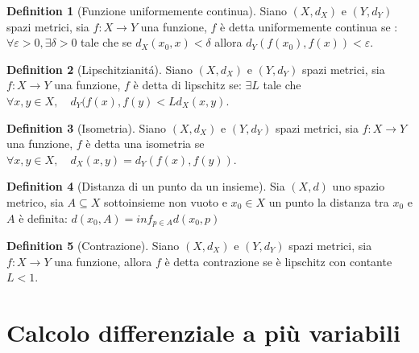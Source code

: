 \documentclass[leqno]{article}
\theoremstyle{definition}
\newtheorem{definition}{Definition}[section]
\numberwithin{equation}{section}
\theoremstyle{remark}
\begin{document}
	\begin{definition}[Funzione uniformemente continua]
		Siano $(X,d_X)$ e $(Y,d_Y)$ spazi metrici, sia $f:X\rightarrow Y$ una funzione, $f$ è detta uniformemente continua se : $\forall \varepsilon > 0, \exists \delta > 0 $ tale che se $d_X(x_0,x) < \delta$ allora $d_Y(f(x_0),f(x)) < \varepsilon$.
	\end{definition}
	\begin{definition}[Lipschitzianitá]
		Siano $(X,d_X)$ e $(Y,d_Y)$ spazi metrici, sia $f:X\rightarrow Y$ una funzione, $f$ è detta di lipschitz se: $\exists L$ tale che $\forall x,y \in X, \quad d_Y(f(x),f(y)<Ld_X(x,y)$.
	\end{definition}
	\begin{definition}[Isometria]
		Siano $(X,d_X)$ e $(Y,d_Y)$ spazi metrici, sia $f:X\rightarrow Y$ una funzione, $f$ è detta una isometria se $\forall x,y \in X, \quad d_X(x,y)=d_Y(f(x),f(y))$. 
	\end{definition}
	\begin{definition}[Distanza di un punto da un insieme]
		Sia $(X,d)$ uno spazio metrico, sia $A\subseteq X$ sottoinsieme non vuoto e $x_0 \in X$ un punto la distanza tra $x_0$ e $A$ è definita: $d(x_0,A)=inf_{p\in A}d(x_0,p)$
	\end{definition}
	\begin{definition}[Contrazione]
		Siano $(X,d_X)$ e $(Y,d_Y)$ spazi metrici, sia $f:X\rightarrow Y$ una funzione, allora $f$ è detta contrazione se è lipschitz con contante $L<1$.
	\end{definition}
	
	\section{Calcolo differenziale a più variabili}
	
\end{document}
